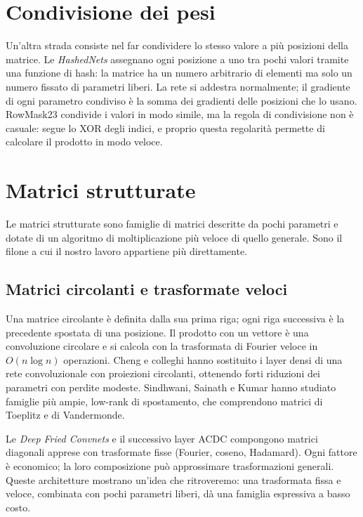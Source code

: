 \section{Condivisione dei pesi}

Un'altra strada consiste nel far condividere lo stesso valore a più posizioni della matrice. Le \emph{HashedNets} \cite{chen2015compressing} assegnano ogni posizione a uno tra pochi valori tramite una funzione di hash: la matrice ha un numero arbitrario di elementi ma solo un numero fissato di parametri liberi. La rete si addestra normalmente; il gradiente di ogni parametro condiviso è la somma dei gradienti delle posizioni che lo usano. RowMask23 condivide i valori in modo simile, ma la regola di condivisione non è casuale: segue lo XOR degli indici, e proprio questa regolarità permette di calcolare il prodotto in modo veloce.

\section{Matrici strutturate}

Le matrici strutturate sono famiglie di matrici descritte da pochi parametri e dotate di un algoritmo di moltiplicazione più veloce di quello generale. Sono il filone a cui il nostro lavoro appartiene più direttamente.

\subsection{Matrici circolanti e trasformate veloci}

Una matrice circolante è definita dalla sua prima riga; ogni riga successiva è la precedente spostata di una posizione. Il prodotto con un vettore è una convoluzione circolare e si calcola con la trasformata di Fourier veloce in $O(n\log n)$ operazioni. Cheng e colleghi \cite{cheng2015exploration} hanno sostituito i layer densi di una rete convoluzionale con proiezioni circolanti, ottenendo forti riduzioni dei parametri con perdite modeste. Sindhwani, Sainath e Kumar \cite{sindhwani2015structured} hanno studiato famiglie più ampie, low-rank di spostamento, che comprendono matrici di Toeplitz e di Vandermonde.

Le \emph{Deep Fried Convnets} \cite{yang2015deep} e il successivo layer ACDC \cite{moczulski2016acdc} compongono matrici diagonali apprese con trasformate fisse (Fourier, coseno, Hadamard). Ogni fattore è economico; la loro composizione può approssimare trasformazioni generali. Queste architetture mostrano un'idea che ritroveremo: una trasformata fissa e veloce, combinata con pochi parametri liberi, dà una famiglia espressiva a basso costo.

